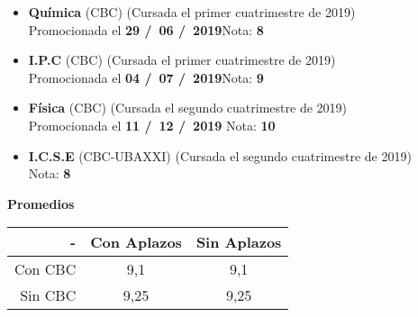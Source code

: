 \begin{itemize}[leftmargin=0.8cm]
  \item{\textbf{Química} (CBC) (Cursada el primer cuatrimestre de 2019)\\
  Promocionada el \textbf{29 \slash \ 06 \slash \ 2019}\hfill Nota: \textbf{8}}

  \item{\textbf{I.P.C} (CBC) (Cursada el primer cuatrimestre de 2019)\\
  Promocionada el \textbf{04 \slash \ 07 \slash \ 2019}\hfill Nota: \textbf{9}}

  \item{\textbf{Física} (CBC) (Cursada el segundo cuatrimestre de 2019)\\
  Promocionada el \textbf{11 \slash \ 12 \slash \ 2019} \hfill Nota: \textbf{10}}

  \item{\textbf{I.C.S.E} (CBC-UBAXXI) (Cursada el segundo cuatrimestre de 2019)\\
  Nota: \textbf{8}}

\end{itemize}

\begin{center}
\textbf{Promedios}

  \begin{tabular}{|r|c|c|}
    \hline
    - & Con Aplazos & Sin Aplazos \\
    \hline
    Con CBC & 9,1 & 9,1 \\
    \hline
    Sin CBC & 9,25 & 9,25 \\
    \hline
  \end{tabular}

\end{center}
